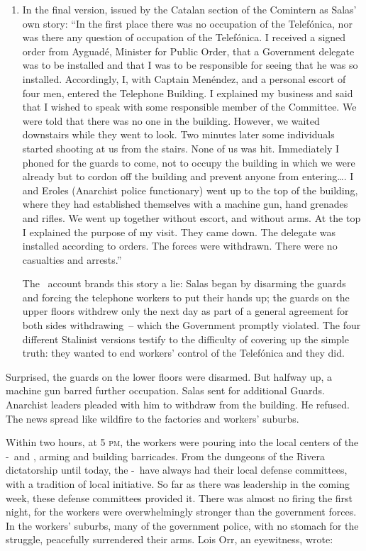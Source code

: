 {\begin{enumerate}
  \item In the final version, issued by the Catalan section of the Comintern as Salas’ own story: ``In the first place there was no occupation of the Telef\'onica, nor was there any question of occupation of the Telef\'onica. I received a signed order from Ayguad\'e, Minister for Public Order, that a Government delegate was to be installed and that I was to be responsible for seeing that he was so installed. Accordingly, I, with Captain Men\'endez, and a personal escort of four men, entered the Telephone Building. I explained my business and said that I wished to speak with some responsible member of the Committee. We were told that there was no one in the building. However, we waited downstairs while they went to look. Two minutes later some individuals started shooting at us from the stairs. None of us was hit. Immediately I phoned for the guards to come, not to occupy the building in which we were already but to cordon off the building and prevent anyone from entering\dots. I and Eroles (Anarchist police functionary) went up to the top of the building, where they had established themselves with a machine gun, hand grenades and rifles. We went up together without escort, and without arms. At the top I explained the purpose of my visit. They came down. The delegate was installed according to orders. The forces were withdrawn. There were no casualties and arrests.''
  
  The \CNT\ account brands this story a lie: Salas began by disarming the guards and forcing the telephone workers to put their hands up; the guards on the upper floors withdrew only the next day as part of a general agreement for both sides withdrawing~-- which the Government promptly violated. The four different Stalinist versions testify to the difficulty of covering up the simple truth: they wanted to end workers’ control of the Telef\'onica and they did.
\end{enumerate}

}

Surprised, the guards on the lower floors were disarmed. But halfway up, a machine gun barred further occupation. Salas sent for additional Guards. Anarchist leaders pleaded with him to withdraw from the building. He refused. The news spread like wildfire to the factories and workers’ suburbs.

Within two hours, at 5 \textsc{pm,} the workers were pouring into the local centers of the \CNT-\FAI\ and \POUM, arming and building barricades. From the dungeons of the Rivera dictatorship until today, the \CNT-\FAI\ have always had their local defense committees, with a tradition of local initiative. So far as there was leadership in the coming week, these defense committees provided it. There was almost no firing the first night, for the workers were overwhelmingly stronger than the government forces. In the workers’ suburbs, many of the government police, with no stomach for the struggle, peacefully surrendered their arms. Lois Orr, an eyewitness, wrote:
\nowidow

